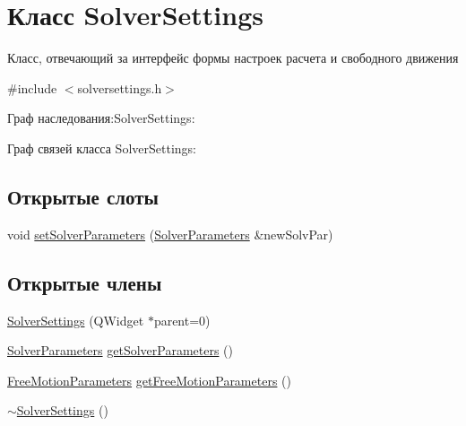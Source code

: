\hypertarget{class_solver_settings}{}\section{Класс Solver\+Settings}
\label{class_solver_settings}


Класс, отвечающий за интерфейс формы настроек расчета и свободного движения  




{\ttfamily \#include $<$solversettings.\+h$>$}



Граф наследования\+:Solver\+Settings\+:


Граф связей класса Solver\+Settings\+:
\subsection*{Открытые слоты}
\begin{DoxyCompactItemize}
\item 
void \mbox{\hyperlink{class_solver_settings_ac72ad464747097ad1dc8b88768ca7cad}{set\+Solver\+Parameters}} (\mbox{\hyperlink{struct_solver_parameters}{Solver\+Parameters}} \&new\+Solv\+Par)
\end{DoxyCompactItemize}
\subsection*{Открытые члены}
\begin{DoxyCompactItemize}
\item 
\mbox{\hyperlink{class_solver_settings_ab479afee5cefe333747cc121bc7ae5e7}{Solver\+Settings}} (Q\+Widget $\ast$parent=0)
\item 
\mbox{\hyperlink{struct_solver_parameters}{Solver\+Parameters}} \mbox{\hyperlink{class_solver_settings_aef7243e388288a838bfc1cb0bfece815}{get\+Solver\+Parameters}} ()
\item 
\mbox{\hyperlink{struct_free_motion_parameters}{Free\+Motion\+Parameters}} \mbox{\hyperlink{class_solver_settings_a0b9e0d4142c92abcce9738fbac7d0f3c}{get\+Free\+Motion\+Parameters}} ()
\item 
\mbox{\hyperlink{class_solver_settings_a233ef39aabfee58f26c1594419a2c3d3}{$\sim$\+Solver\+Settings}} ()
\end{DoxyCompactItemize}
